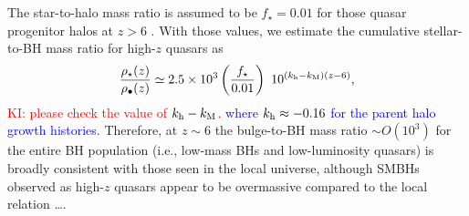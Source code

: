 \documentclass[twocolumn, twocolappendix]{aastex63}
\newcommand{\Msunyr}{M_\odot~{\rm yr}^{-1}}
\newcommand{\Mh}{M_\mathrm{h}}
\newcommand{\D}{\mathrm{d}}
\newcommand{\red}[1]{\textcolor{red}{ #1}}
\newcommand{\blue}[1]{\textcolor{blue}{ #1}}
\begin{document}
\begin{CJK*}{UTF8}{gbsn}

The star-to-halo mass ratio is assumed to be $f_\star =0.01$ for those quasar progenitor halos at $z>6$
\citep[fits by code {\tt UNIVERSEMACHINE} in][]{2019MNRAS.488.3143B}.
With those values, we estimate the cumulative stellar-to-BH mass ratio for high-$z$ quasars as
%
\begin{equation}
\frac{\rho_{\star}(z)}{\rho_{\bullet}(z)}
\simeq 2.5\times 10^{3} \left(\frac{f_\star}{0.01}\right)
~ 10^{(k_{\rm h}-k_{\rm M})(z-6)},
\end{equation}
\red{KI: please check the value of $k_{\rm h}-k_{\rm M}$.}
\blue{
where $k_{\rm h} \approx -0.16 $ for the parent halo growth histories.
}
Therefore, at $z\sim 6$ the bulge-to-BH mass ratio $\sim O(10^3)$ for the entire BH population (i.e., low-mass BHs and low-luminosity quasars) 
is broadly consistent with those seen in the local universe, although SMBHs observed as high-$z$ quasars
appear to be overmassive compared to the local relation \citep{2013ApJ...773...44W,2020A&A...637A..84P} \dots.


\end{CJK*}
\end{document}
